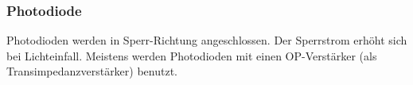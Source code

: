 		\subsubsection{Photodiode}
			Photodioden werden in Sperr-Richtung angeschlossen. Der Sperrstrom erhöht sich
			bei Lichteinfall. Meistens werden Photodioden mit einen OP-Verstärker (als
			Transimpedanzverstärker) benutzt. \\